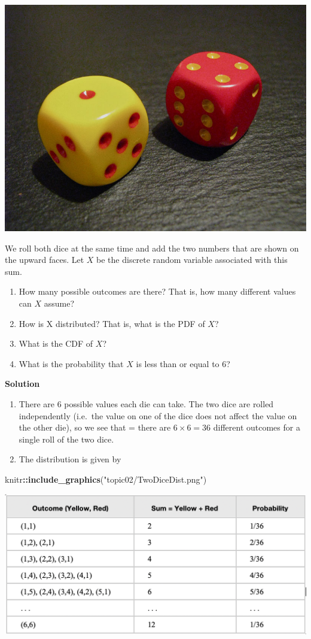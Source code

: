 \documentclass[
]{book}
\newenvironment{Shaded}{\begin{snugshade}}{\end{snugshade}}
\newcommand{\FunctionTok}[1]{\textcolor[rgb]{0.13,0.29,0.53}{\textbf{#1}}}
\newcommand{\NormalTok}[1]{#1}
\newcommand{\SpecialCharTok}[1]{\textcolor[rgb]{0.81,0.36,0.00}{\textbf{#1}}}
\newcommand{\StringTok}[1]{\textcolor[rgb]{0.31,0.60,0.02}{#1}}
\begin{document}
\begin{center}\includegraphics[width=0.3\linewidth]{topic02/TwoDice} \end{center}

We roll both dice at the same time and add the two numbers that are shown on the upward faces.
Let \(X\) be the discrete random variable associated with this sum.

\begin{enumerate}
\def\labelenumi{\arabic{enumi}.}
\item
  How many possible outcomes are there? That is, how many different values can \(X\) assume?
\item
  How is X distributed? That is, what is the PDF of \(X\)?
\item
  What is the CDF of \(X\)?
\item
  What is the probability that \(X\) is less than or equal to 6?
\end{enumerate}

\textbf{Solution}

\begin{enumerate}
\def\labelenumi{\arabic{enumi}.}
\item
  There are 6 possible values each die can take. The two dice are rolled independently (i.e.~the value on one of the dice does not affect the value on the other die), so we see that = there are \(6 \times 6 = 36\) different outcomes for a single roll of the two dice.
\item
  The distribution is given by
\end{enumerate}

\begin{Shaded}
\begin{Highlighting}[]
\NormalTok{knitr}\SpecialCharTok{::}\FunctionTok{include\_graphics}\NormalTok{(}\StringTok{"topic02/TwoDiceDist.png"}\NormalTok{)}
\end{Highlighting}
\end{Shaded}

\begin{center}\includegraphics[width=0.5\linewidth]{topic02/TwoDiceDist} \end{center}
\end{document}
